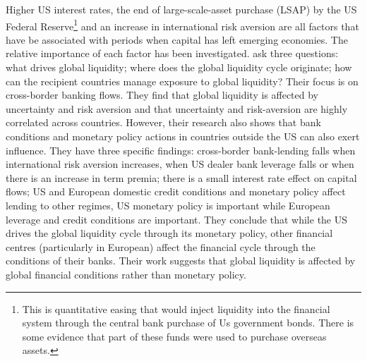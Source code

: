 \documentclass[12pt, a4paper, oneside]{article} %
\begin{document}
Higher US interest rates, the end of large-scale-asset purchase (LSAP) by the US Federal Reserve\footnote{This is quantitative easing that would inject liquidity into the financial system through the central bank purchase of Us government bonds.  There is some evidence that part of these funds were used to purchase overseas assets. } and an increase in international risk aversion are all factors that have be associated with periods when capital has left emerging economies. The relative importance of each factor has been investigated.  \citet{Cerutti2014} ask three questions:  what drives global liquidity; where does the global liquidity cycle originate; how can the recipient countries manage exposure to global liquidity?  Their focus is on cross-border banking flows. They find that global liquidity is affected by uncertainty and risk aversion and that uncertainty and risk-aversion are highly correlated across countries. However, their research also shows that bank conditions and monetary policy actions in countries outside the US can also exert influence. They have three specific findings:  cross-border bank-lending falls when international risk aversion increases, when US dealer bank leverage falls or when there is an increase in term premia; there is a small interest rate effect on capital flows; US and European domestic credit conditions and monetary policy affect lending to other regimes, US monetary policy is important while European leverage and credit conditions are important.  They conclude that while the US drives the global liquidity cycle through its monetary policy, other financial centres (particularly in European) affect the financial cycle through the conditions of their banks. Their work suggests that global liquidity is affected by global financial conditions rather than monetary policy.
\end{document}
